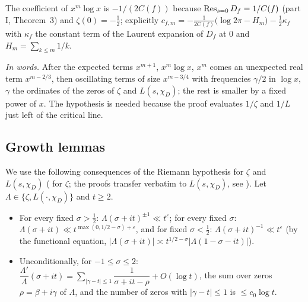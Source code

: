 \documentclass[11pt,a4paper]{article}
\theoremstyle{remark}\newtheorem{remark}[theorem]{Remark}
\begin{document}
The coefficient of $x^m\log x$ is $-1/(2C(f))$ because $\operatorname*{Res}_{s=0}D_f=1/C(f)$ (part I, Theorem~3) and
$\zeta(0)=-\tfrac12$; explicitly $c_{f,m}=-\frac1{2C(f)}\bigl(\log2\pi-H_m\bigr)-\tfrac12\kappa_f$ with
$\kappa_f$ the constant term of the Laurent expansion of $D_f$ at $0$ and $H_m=\sum_{k\le m}1/k$.

\emph{In words.} After the expected terms $x^{m+1}$, $x^m\log x$, $x^m$ comes an unexpected real term
$x^{m-2/3}$, then oscillating terms of size $x^{m-3/4}$ with frequencies $\gamma/2$ in $\log x$, $\gamma$ the
ordinates of the zeros of $\zeta$ and $L(s,\chi_D)$; the rest is smaller by a fixed power of $x$. The
hypothesis is needed because the proof evaluates $1/\zeta$ and $1/L$ just left of the critical line.

\subsection{Growth lemmas}

We use the following consequences of the Riemann hypothesis for $\zeta$ and $L(s,\chi_D)$
(\cite[Chapter~14]{Titchmarsh1986} for $\zeta$; the proofs transfer verbatim to $L(s,\chi_D)$, see
\cite[\S5.7]{IwaniecKowalski2004}). Let $\Lambda\in\{\zeta,L(\cdot,\chi_D)\}$ and $t\ge2$.
\begin{itemize}
\item[(G1)] For every fixed $\sigma>\tfrac12$: $\Lambda(\sigma+it)^{\pm1}\ll t^{\varepsilon}$; for every fixed $\sigma$:
$\Lambda(\sigma+it)\ll t^{\max(0,1/2-\sigma)+\varepsilon}$, and for fixed $\sigma<\tfrac12$:
$\Lambda(\sigma+it)^{-1}\ll t^{\varepsilon}$ (by the functional equation, $|\Lambda(\sigma+it)|\asymp t^{1/2-\sigma}|\Lambda(1-\sigma-it)|$).
\item[(G2)] Unconditionally, for $-1\le\sigma\le2$: $\dfrac{\Lambda'}{\Lambda}(\sigma+it)=\sum_{|\gamma-t|\le1}\dfrac1{\sigma+it-\rho}+O(\log t)$,
the sum over zeros $\rho=\beta+i\gamma$ of $\Lambda$, and the number of zeros with $|\gamma-t|\le1$ is $\le c_0\log t$.
\end{itemize}
\end{document}
